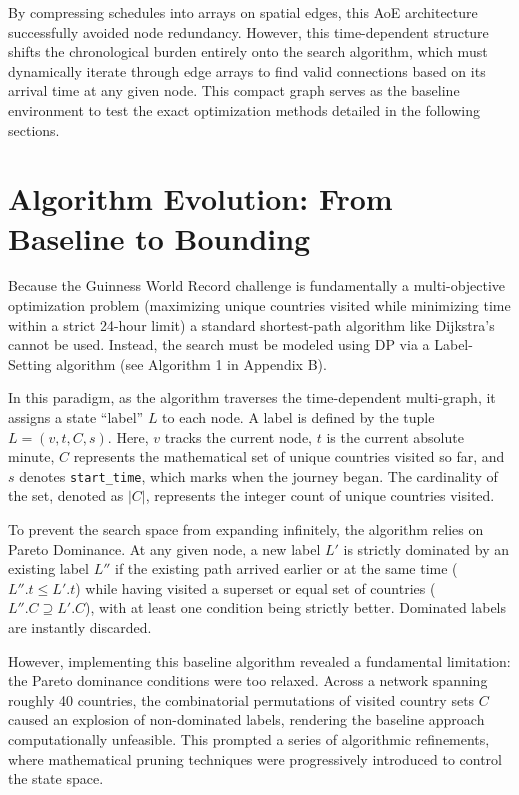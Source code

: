By compressing schedules into arrays on spatial edges, this AoE architecture successfully avoided node redundancy. However, this time-dependent structure shifts the chronological burden entirely onto the search algorithm, which must dynamically iterate through edge arrays to find valid connections based on its arrival time at any given node. This compact graph serves as the baseline environment to test the exact optimization methods detailed in the following sections.

\section{Algorithm Evolution: From Baseline to Bounding}
\label{sec:algorithm_evolution}

\noindent
Because the Guinness World Record challenge is fundamentally a multi-objective optimization problem (maximizing unique countries visited while minimizing time within a strict 24-hour limit) a standard shortest-path algorithm like Dijkstra's cannot be used. Instead, the search must be modeled using DP via a Label-Setting algorithm (see Algorithm 1 in Appendix B).

\medskip

In this paradigm, as the algorithm traverses the time-dependent multi-graph, it assigns a state ``label'' $L$ to each node. A label is defined by the tuple $L = (v, t, C, s)$. Here, $v$ tracks the current node, $t$ is the current absolute minute, $C$ represents the mathematical set of unique countries visited so far, and $s$ denotes \texttt{start\_time}, which marks when the journey began. The cardinality of the set, denoted as $|C|$, represents the integer count of unique countries visited.

\medskip

To prevent the search space from expanding infinitely, the algorithm relies on Pareto Dominance. At any given node, a new label $L'$ is strictly dominated by an existing label $L''$ if the existing path arrived earlier or at the same time ($L''.t \leq L'.t$) while having visited a superset or equal set of countries ($L''.C \supseteq L'.C$), with at least one condition being strictly better. Dominated labels are instantly discarded.

\medskip

However, implementing this baseline algorithm revealed a fundamental limitation: the Pareto dominance conditions were too relaxed. Across a network spanning roughly 40 countries, the combinatorial permutations of visited country sets $C$ caused an explosion of non-dominated labels, rendering the baseline approach computationally unfeasible. This prompted a series of algorithmic refinements, where mathematical pruning techniques were progressively introduced to control the state space.

